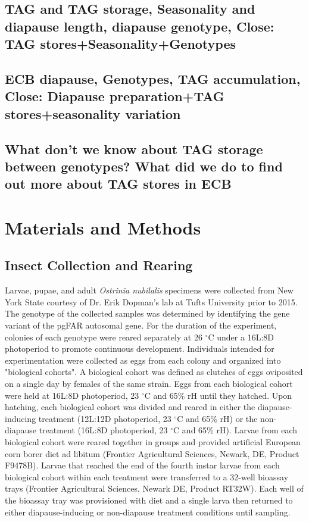 \documentclass[review]{elsarticle}
\begin{document}
\subsection{TAG and TAG storage, Seasonality and diapause length, diapause genotype, Close: TAG stores+Seasonality+Genotypes}

\subsection{ECB diapause, Genotypes, TAG accumulation, Close: Diapause preparation+TAG stores+seasonality variation}

\subsection{What don't we know about TAG storage between genotypes? What did we do to find out more about TAG stores in ECB}

\section{Materials and Methods}
\subsection{Insect Collection and Rearing}
Larvae, pupae, and adult \textit{Ostrinia nubilalis} specimens were collected from New York State courtesy of Dr. Erik Dopman's lab at Tufts University prior to 2015. The genotype of the collected samples was determined by identifying the gene variant of the pgFAR autosomal gene\citep{Lassance2010,Wadsworth2015}. For the duration of the experiment, colonies of each genotype were reared separately at 26 $^\circ$C under a 16L:8D photoperiod to promote continuous development. 
Individuals intended for experimentation were collected as eggs from each colony and organized into "biological cohorts". A biological cohort was defined as clutches of eggs oviposited on a single day by females of the same strain. Eggs from each biological cohort were held at 16L:8D photoperiod, 23 $^\circ$C and 65\% rH until they hatched. Upon hatching, each biological cohort was divided and reared in either the diapause-inducing treatment (12L:12D photoperiod, 23 $^\circ$C and 65\% rH) or the non-diapause treatment (16L:8D photoperiod, 23 $^\circ$C and 65\% rH). Larvae from each biological cohort were reared together in groups and provided artificial European corn borer diet ad libitum (Frontier Agricultural Sciences, Newark, DE, Product F9478B). Larvae that reached the end of the fourth instar larvae from each biological cohort within each treatment were transferred to a 32-well bioassay trays (Frontier Agricultural Sciences, Newark DE, Product RT32W). Each well of the bioassay tray was provisioned with diet and a single larva then returned to either diapause-inducing or non-diapause treatment conditions until sampling.
\end{document}
